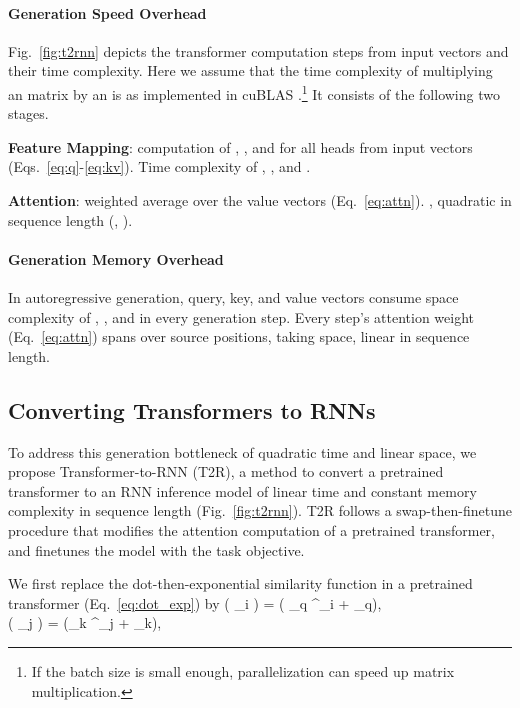 \documentclass[11pt,a4paper]{article}
\def\vphi{{\boldsymbol{\phi}}}
\def\vb{{\mathbf{b}}}
\def\vk{{\mathbf{k}}}
\def\vq{{\mathbf{q}}}
\def\vx{{\mathbf{x}}}
\def\mW{{\mathbf{W}}}
\newcommand{\src}{{\mathrm{src}}}
\newcommand{\tgt}{{\mathrm{tgt}}}
\newcommand{\relu}{{\operatorname{relu}}}
\newcommand{\TRNN}{T2R\xspace}
\begin{document}
\paragraph{Generation Speed Overhead}
Fig.\ \ref{fig:t2rnn} depicts the transformer computation steps from input vectors and their time complexity.
Here we assume that the time complexity of multiplying an  matrix by an  is  as implemented in cuBLAS \cite{cublas}.\footnote{If the batch size is small enough, parallelization can speed up matrix multiplication.}
It consists of the following two stages.
\begin{compactitem}
\item \textbf{Feature Mapping}: computation of ,  , and  for all  heads from input vectors (Eqs.\ \ref{eq:q}-\ref{eq:kv}).
Time complexity of , , and .
\item \textbf{Attention}: weighted average over the value vectors (Eq.\ \ref{eq:attn}). , quadratic in sequence length (, ).
\end{compactitem}
\paragraph{Generation Memory Overhead}
In autoregressive generation, 
query, key, and value vectors consume space complexity of , , and  in every generation step.
Every step's attention weight (Eq.~\ref{eq:attn}) spans over  source positions, taking  space, linear in sequence length.



\subsection{Converting Transformers to RNNs}
\label{sec:convert}
To address this generation bottleneck of quadratic time and linear space, we propose Transformer-to-RNN (\TRNN), a method to convert a pretrained transformer to an RNN inference model of linear time and constant memory complexity in sequence length (Fig.\ \ref{fig:t2rnn}).
\TRNN follows a swap-then-finetune procedure that modifies the attention computation of a pretrained transformer, and finetunes the model with the task objective.

We first replace the dot-then-exponential similarity function in a pretrained transformer (Eq.~\ref{eq:dot_exp}) by
\vphi \left( \vq_{i} \right) = \relu\left( \widetilde{\mW}_q \vx^\tgt_i + \widetilde{\vb}_q\right), \label{eq:phiq} \\
  \vphi \left( \vk_{j} \right) = \relu\left(\widetilde{\mW}_k \vx^\src_j + \widetilde{\vb}_k\right),\label{eq:phik}
\end{document}
